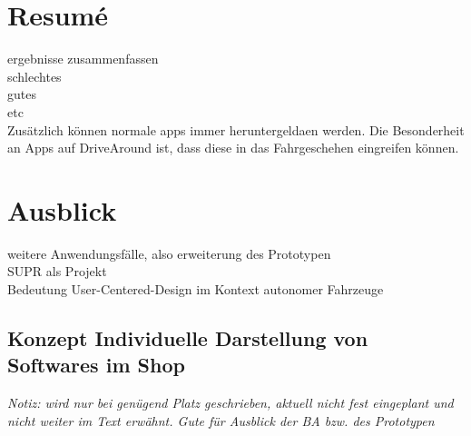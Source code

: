 \section{Resumé}
ergebnisse zusammenfassen\\
schlechtes\\
gutes\\
etc\\
Zusätzlich können normale apps immer heruntergeldaen werden. Die Besonderheit an Apps auf DriveAround ist, dass diese in das Fahrgeschehen eingreifen können.

\section{Ausblick}
weitere Anwendungsfälle, also erweiterung des Prototypen\\
SUPR als Projekt\\
Bedeutung User-Centered-Design im Kontext autonomer Fahrzeuge

\subsection{Konzept Individuelle Darstellung von Softwares im Shop}
\textit{Notiz: wird nur bei genügend Platz geschrieben, aktuell nicht fest eingeplant und nicht weiter im Text erwähnt. Gute für Ausblick der BA bzw. des Prototypen}